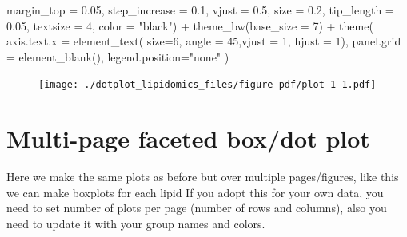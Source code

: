 \documentclass[
  letterpaper,
  DIV=11,
  numbers=noendperiod]{scrreprt}
\newenvironment{Shaded}{\begin{snugshade}}{\end{snugshade}}
\newcommand{\AttributeTok}[1]{\textcolor[rgb]{0.40,0.45,0.13}{#1}}
\newcommand{\DecValTok}[1]{\textcolor[rgb]{0.68,0.00,0.00}{#1}}
\newcommand{\FloatTok}[1]{\textcolor[rgb]{0.68,0.00,0.00}{#1}}
\newcommand{\FunctionTok}[1]{\textcolor[rgb]{0.28,0.35,0.67}{#1}}
\newcommand{\NormalTok}[1]{\textcolor[rgb]{0.00,0.23,0.31}{#1}}
\newcommand{\SpecialCharTok}[1]{\textcolor[rgb]{0.37,0.37,0.37}{#1}}
\newcommand{\StringTok}[1]{\textcolor[rgb]{0.13,0.47,0.30}{#1}}
\begin{document}
\begin{Shaded}
\begin{Highlighting}[]
    \AttributeTok{margin\_top =} \FloatTok{0.05}\NormalTok{, }\AttributeTok{step\_increase =} \FloatTok{0.1}\NormalTok{, }\AttributeTok{vjust =} \FloatTok{0.5}\NormalTok{, }\AttributeTok{size =} \FloatTok{0.2}\NormalTok{, }
    \AttributeTok{tip\_length =} \FloatTok{0.05}\NormalTok{, }\AttributeTok{textsize =} \DecValTok{4}\NormalTok{, }\AttributeTok{color =} \StringTok{"black"}\NormalTok{) }\SpecialCharTok{+}
  \FunctionTok{theme\_bw}\NormalTok{(}\AttributeTok{base\_size =} \DecValTok{7}\NormalTok{) }\SpecialCharTok{+} 
  \FunctionTok{theme}\NormalTok{(}
    \AttributeTok{axis.text.x =} \FunctionTok{element\_text}\NormalTok{( }\AttributeTok{size=}\DecValTok{6}\NormalTok{, }\AttributeTok{angle =} \DecValTok{45}\NormalTok{,}\AttributeTok{vjust =} \DecValTok{1}\NormalTok{, }\AttributeTok{hjust =} \DecValTok{1}\NormalTok{),}
    \AttributeTok{panel.grid =} \FunctionTok{element\_blank}\NormalTok{(),}
    \AttributeTok{legend.position=}\StringTok{"none"}
\NormalTok{  )}
\end{Highlighting}
\end{Shaded}

\begin{figure}[H]

{\centering \texttt{[image: ./dotplot\_lipidomics\_files/figure-pdf/plot-1-1.pdf]}

}

\end{figure}

\hypertarget{multi-page-faceted-boxdot-plot}{%
\section{Multi-page faceted box/dot
plot}\label{multi-page-faceted-boxdot-plot}}

Here we make the same plots as before but over multiple pages/figures,
like this we can make boxplots for each lipid If you adopt this for your
own data, you need to set number of plots per page (number of rows and
columns), also you need to update it with your group names and colors.
\end{document}
